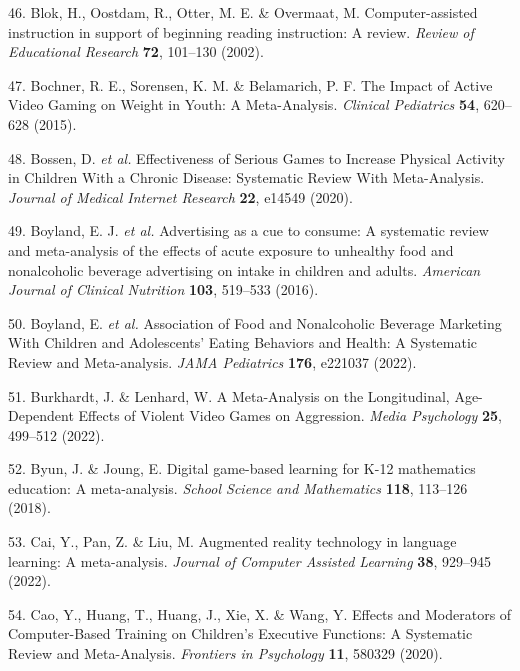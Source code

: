 \documentclass[
  english,
  man]{apa6}
\newenvironment{cslreferences}%
  {}%
  {\par}
\begin{document}
\begin{cslreferences}
\leavevmode\hypertarget{ref-blokComputerassistedInstructionSupport2002}{}%
46. Blok, H., Oostdam, R., Otter, M. E. \& Overmaat, M. Computer-assisted instruction in support of beginning reading instruction: A review. \emph{Review of Educational Research} \textbf{72}, 101--130 (2002).

\leavevmode\hypertarget{ref-bochnerImpactActiveVideo2015}{}%
47. Bochner, R. E., Sorensen, K. M. \& Belamarich, P. F. The Impact of Active Video Gaming on Weight in Youth: A Meta-Analysis. \emph{Clinical Pediatrics} \textbf{54}, 620--628 (2015).

\leavevmode\hypertarget{ref-bossenEffectivenessSeriousGames2020}{}%
48. Bossen, D. \emph{et al.} Effectiveness of Serious Games to Increase Physical Activity in Children With a Chronic Disease: Systematic Review With Meta-Analysis. \emph{Journal of Medical Internet Research} \textbf{22}, e14549 (2020).

\leavevmode\hypertarget{ref-boylandAdvertisingCueConsume2016}{}%
49. Boyland, E. J. \emph{et al.} Advertising as a cue to consume: A systematic review and meta-analysis of the effects of acute exposure to unhealthy food and nonalcoholic beverage advertising on intake in children and adults. \emph{American Journal of Clinical Nutrition} \textbf{103}, 519--533 (2016).

\leavevmode\hypertarget{ref-boylandAssociationFoodNonalcoholic2022}{}%
50. Boyland, E. \emph{et al.} Association of Food and Nonalcoholic Beverage Marketing With Children and Adolescents' Eating Behaviors and Health: A Systematic Review and Meta-analysis. \emph{JAMA Pediatrics} \textbf{176}, e221037 (2022).

\leavevmode\hypertarget{ref-burkhardtMetaAnalysisLongitudinalAgeDependent2022}{}%
51. Burkhardt, J. \& Lenhard, W. A Meta-Analysis on the Longitudinal, Age-Dependent Effects of Violent Video Games on Aggression. \emph{Media Psychology} \textbf{25}, 499--512 (2022).

\leavevmode\hypertarget{ref-byunDigitalGamebasedLearning2018}{}%
52. Byun, J. \& Joung, E. Digital game-based learning for K-12 mathematics education: A meta-analysis. \emph{School Science and Mathematics} \textbf{118}, 113--126 (2018).

\leavevmode\hypertarget{ref-caiAugmentedRealityTechnology2022}{}%
53. Cai, Y., Pan, Z. \& Liu, M. Augmented reality technology in language learning: A meta-analysis. \emph{Journal of Computer Assisted Learning} \textbf{38}, 929--945 (2022).

\leavevmode\hypertarget{ref-caoEffectsModeratorsComputerBased2020}{}%
54. Cao, Y., Huang, T., Huang, J., Xie, X. \& Wang, Y. Effects and Moderators of Computer-Based Training on Children's Executive Functions: A Systematic Review and Meta-Analysis. \emph{Frontiers in Psychology} \textbf{11}, 580329 (2020).


\end{cslreferences}
\end{document}

